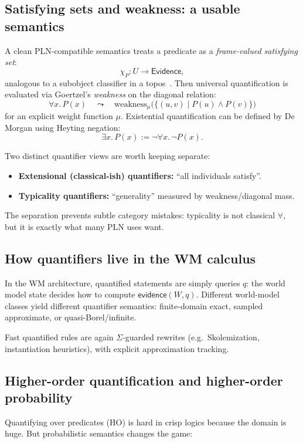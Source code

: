 \documentclass[11pt]{article}
\newcommand{\Evidence}{\mathsf{Evidence}}
\newcommand{\ev}{\mathsf{evidence}}
\begin{document}
\subsection{Satisfying sets and weakness: a usable semantics}

A clean PLN-compatible semantics treats a predicate as a \emph{frame-valued satisfying set}:
\[
  \chi_P : U \to \Evidence,
\]
analogous to a subobject classifier in a topos~\cite{MacLaneMoerdijk}.
Then universal quantification is evaluated via Goertzel's \emph{weakness} on the diagonal relation:
\[
  \forall x.\,P(x)
  \quad\leadsto\quad
  \mathrm{weakness}_\mu\big(\{(u,v)\mid P(u)\wedge P(v)\}\big)
\]
for an explicit weight function $\mu$.
Existential quantification can be defined by De Morgan using Heyting negation:
\[
  \exists x.\,P(x) := \neg \forall x.\,\neg P(x).
\]

Two distinct quantifier views are worth keeping separate:

\begin{itemize}[leftmargin=2em]
\item \textbf{Extensional (classical-ish) quantifiers:} ``all individuals satisfy''.
\item \textbf{Typicality quantifiers:} ``generality'' measured by weakness/diagonal mass.
\end{itemize}

The separation prevents subtle category mistakes: typicality is not classical $\forall$,
but it is exactly what many PLN uses want.

\subsection{How quantifiers live in the WM calculus}

In the WM architecture, quantified statements are simply queries $q$:
the world model state decides how to compute $\ev(W,q)$.
Different world-model classes yield different quantifier semantics:
finite-domain exact, sampled approximate, or quasi-Borel/infinite.

Fast quantified rules are again $\Sigma$-guarded rewrites (e.g.\ Skolemization,
instantiation heuristics), with explicit approximation tracking.

\subsection{Higher-order quantification and higher-order probability}

Quantifying over predicates (HO) is hard in crisp logics because the domain is huge.
But probabilistic semantics changes the game:
\end{document}
